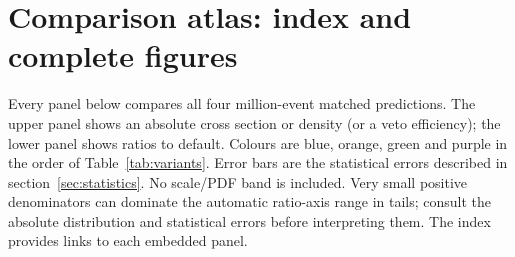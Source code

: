 \documentclass[11pt,a4paper]{article}
\begin{document}
\clearpage
\section{Comparison atlas: index and complete figures}\label{app:atlas}

Every panel below compares all four million-event matched predictions.
The upper panel shows an absolute cross section or density (or a veto
efficiency); the lower panel shows ratios to default. Colours are blue,
orange, green and purple in the order of Table~\ref{tab:variants}.
Error bars are the statistical errors described in
section~\ref{sec:statistics}. No scale/PDF band is included. Very small
positive denominators can dominate the automatic ratio-axis range in
tails; consult the absolute distribution and statistical errors before
interpreting them. The index provides links to each embedded panel.
\end{document}
